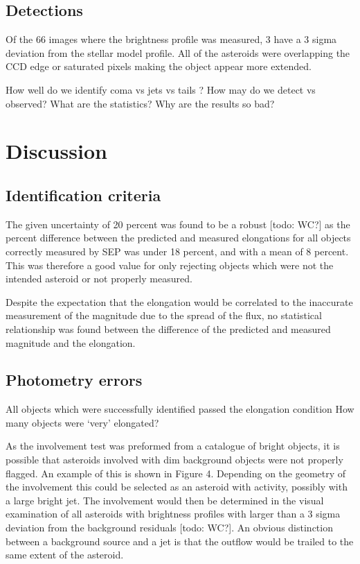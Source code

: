 \documentclass[iop,apj]{emulateapj}
\begin{document}
\subsection{Detections}

Of the 66 images where the brightness profile was measured, 3 have a 3 sigma deviation from the stellar model profile. All of the asteroids were overlapping the CCD edge or saturated pixels making the object appear more extended.

How well do we identify coma vs jets vs tails ? How may do we detect vs observed? What are the statistics? Why are the results so bad?

\section{Discussion}

\subsection{Identification criteria}

The given uncertainty of 20 percent was found to be a robust [todo: WC?] as the percent difference between the predicted and measured elongations for all objects correctly measured by SEP was under 18 percent, and with a mean of 8 percent. This was therefore a good value for only rejecting objects which were not the intended asteroid or not properly measured.

Despite the expectation that the elongation would be correlated to the inaccurate measurement of the magnitude due to the spread of the flux, no statistical relationship was found between the difference of the predicted and measured magnitude and the elongation.

\subsection{Photometry errors}



All objects which were successfully identified passed the elongation condition
How many objects were `very' elongated?


As the involvement test was preformed from a catalogue of bright objects, it is possible that asteroids involved with dim background objects were not properly flagged. An example of this is shown in Figure 4. Depending on the geometry of the involvement this could be selected as an asteroid with activity, possibly with a large bright jet. The involvement would then be determined in the visual examination of all asteroids with brightness profiles with larger than a 3 sigma deviation from the background residuals [todo: WC?]. An obvious distinction between a background source and a jet is that the outflow would be trailed to the same extent of the asteroid.
\end{document}
